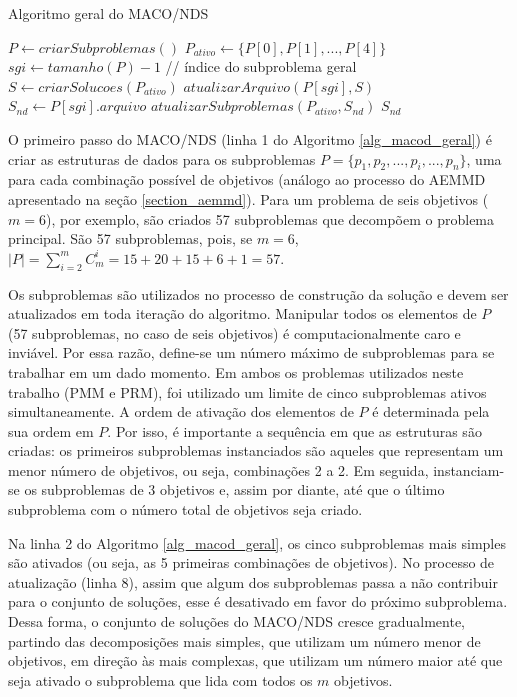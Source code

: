 \begin{algorithm}[!htbp]
	\caption{Algoritmo geral do MACO/NDS}
	\label{alg_macod_geral}
	\begin{algorithmic}[1]
		\State $P \gets criarSubproblemas()$
		\State $P_{ativo} \gets \{P[0], P[1], ..., P[4]\}$
		\State $sgi \gets tamanho(P) - 1$ // índice do subproblema geral
		\State $S \gets criarSolucoes(P_{ativo})$
		\State $atualizarArquivo(P[sgi], S)$
		\State $S_{nd} \gets P[sgi].arquivo$
		\State $atualizarSubproblemas(P_{ativo}, S_{nd})$
		\EndWhile
		\State \Return $S_{nd}$
	\end{algorithmic}
\end{algorithm}

O primeiro passo do MACO/NDS (linha 1 do Algoritmo \ref{alg_macod_geral}) é criar as estruturas de dados para os subproblemas $P = \{p_1, p_2, ..., p_i, ..., p_n\}$, uma para cada combinação possível de objetivos (análogo ao processo do AEMMD apresentado na seção \ref{section_aemmd}). Para um problema de seis objetivos ($m = 6$), por exemplo, são criados 57 subproblemas que decompõem o problema principal. São 57 subproblemas, pois, se $m = 6$, $|P| = \sum_{i = 2}^m C_m^i = 15 + 20 + 15 + 6 + 1 = 57$.

Os subproblemas são utilizados no processo de construção da solução e devem ser atualizados em toda iteração do algoritmo. Manipular todos os elementos de $P$ (57 subproblemas, no caso de seis objetivos) é computacionalmente caro e inviável. Por essa razão, define-se um número máximo de subproblemas para se trabalhar em um dado momento. Em ambos os problemas utilizados neste trabalho (PMM e PRM), foi utilizado um limite de cinco subproblemas ativos simultaneamente. A ordem de ativação dos elementos de $P$ é determinada pela sua ordem em $P$. Por isso, é importante a sequência em que as estruturas são criadas: os primeiros subproblemas instanciados são aqueles que representam um menor número de  objetivos, ou seja, combinações 2 a 2. Em seguida, instanciam-se os subproblemas de 3 objetivos e, assim por diante, até que o último subproblema com o número total de objetivos seja criado.

Na linha 2 do Algoritmo \ref{alg_macod_geral}, os cinco subproblemas mais simples são ativados (ou seja, as 5 primeiras combinações de objetivos). No processo de atualização (linha 8), assim que algum dos subproblemas passa a não contribuir para o conjunto de soluções, esse é desativado em favor do próximo subproblema. Dessa forma, o conjunto de soluções do MACO/NDS cresce gradualmente, partindo das decomposições mais simples, que utilizam um número menor de objetivos, em direção às mais complexas, que utilizam um número maior até que seja ativado o subproblema que lida com todos os $m$ objetivos.

